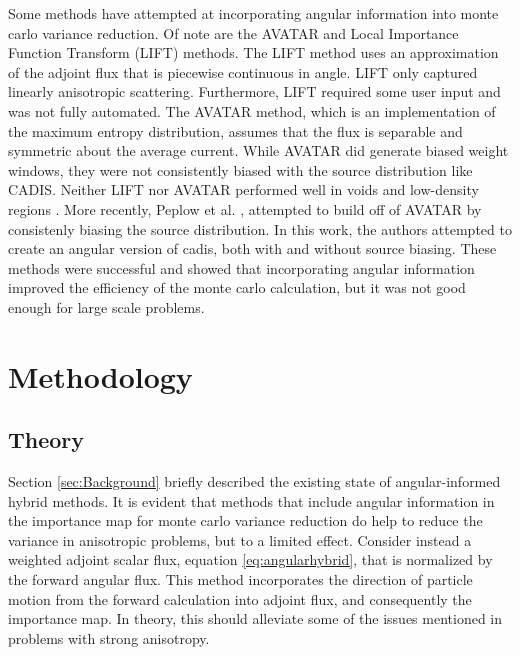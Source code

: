 \documentclass{mc2015}
\begin{document}
Some methods have attempted at incorporating angular information into monte carlo variance reduction. Of note are the AVATAR \cite{van_riper_avatarautomatic_1997} and Local Importance Function Transform (LIFT) \cite{turner_automatic_1997} methods. The LIFT method uses an approximation of the adjoint flux that is piecewise continuous in angle. LIFT only captured linearly anisotropic scattering. Furthermore, LIFT required some user input and was not fully automated. The AVATAR method, which is an implementation of the maximum entropy distribution, assumes that the flux is separable and symmetric about the average current. While AVATAR did generate biased weight windows, they were not consistently biased with the source distribution like CADIS. Neither LIFT nor AVATAR performed well in voids and low-density regions \cite{turner_automatic_1997-1}. More recently, Peplow et al. \cite{Peplow-ORNL}, attempted to build off of AVATAR by consistenly biasing the source distribution. In this work, the authors attempted to create an angular version of cadis, both with and without source biasing. These methods were successful and showed that incorporating angular information improved the efficiency of the monte carlo calculation, but it was not good enough for large scale problems. 

\section{Methodology}
\label{sec:Methodology}

\subsection{Theory}
\label{sec:Theory}

Section \ref{sec:Background} briefly described the existing state of angular-informed hybrid methods. It is evident that methods that include angular information in the importance map for monte carlo variance reduction do help to reduce the variance in anisotropic problems, but to a limited effect. 
Consider instead a weighted adjoint scalar flux, equation \ref{eq:angularhybrid}, that is normalized by the forward angular flux. This method incorporates the direction of particle motion from the forward calculation into adjoint flux, and consequently the importance map. In theory, this should alleviate some of the issues mentioned in problems with strong anisotropy. 
\end{document}
